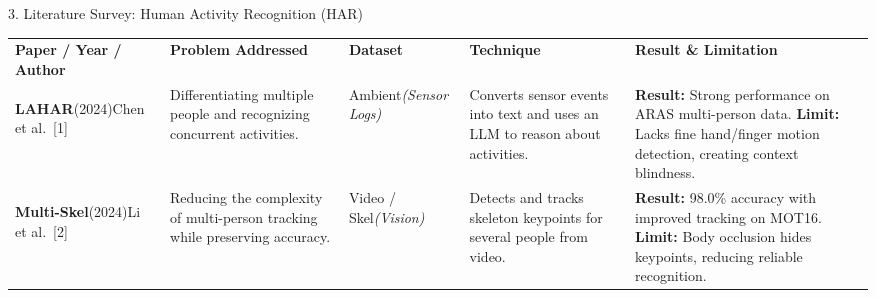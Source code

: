 \documentclass[aspectratio=169,11pt,xcolor=table]{beamer}
\begin{document}
\begin{frame}[t]{3. Literature Survey: Human Activity Recognition (HAR)}

\vspace{-0.1cm} %
\centering
\fontsize{5.5}{6.5}\selectfont
\renewcommand{\arraystretch}{1.05} %
\setlength{\tabcolsep}{3pt}

\begin{tabular}{
>{\bfseries\RaggedRight\arraybackslash}m{}
>{\RaggedRight\arraybackslash}m{}
>{\RaggedRight\arraybackslash}m{}
>{\RaggedRight\arraybackslash}m{}
>{\RaggedRight\arraybackslash}m{} %
}

\rowcolor{AmritaMaroon}
{\color{white}\textbf{Paper / Year / Author}} &
{\color{white}\textbf{Problem Addressed}} &
{\color{white}\textbf{Dataset}} &
{\color{white}\textbf{Technique}} &
{\color{white}\textbf{Result \& Limitation}} \\

\arrayrulecolor{white}\hline

\rowcolor{LightBlue}
\textbf{LAHAR}\newline \textnormal{(2024)}\newline \textnormal{Chen et al.~[1]} &
Differentiating multiple people and recognizing concurrent activities. &
Ambient\newline\textit{(Sensor Logs)} &
Converts sensor events into text and uses an LLM to reason about activities. &
\textbf{Result:} Strong performance on ARAS multi-person data.\newline
\textbf{Limit:} Lacks fine hand/finger motion detection, creating context blindness. \\

\hline

\rowcolor{LightGreen}
\textbf{Multi-Skel}\newline \textnormal{(2024)}\newline \textnormal{Li et al.~[2]} &
Reducing the complexity of multi-person tracking while preserving accuracy. &
Video / Skel\newline\textit{(Vision)} &
Detects and tracks skeleton keypoints for several people from video. &
\textbf{Result:} 98.0\% accuracy with improved tracking on MOT16.\newline
\textbf{Limit:} Body occlusion hides keypoints, reducing reliable recognition. \\


\end{tabular}
\end{frame}
\end{document}
